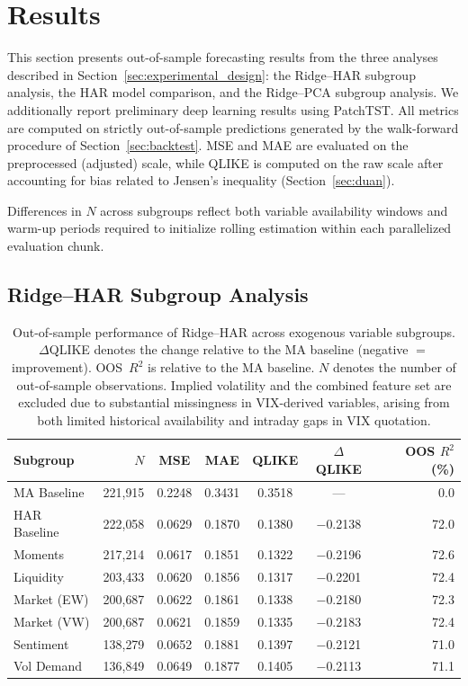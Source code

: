 \section{Results}
\label{sec:results}

This section presents out-of-sample forecasting results from the three analyses described in Section~\ref{sec:experimental_design}: the Ridge--HAR subgroup analysis, the HAR model comparison, and the Ridge--PCA subgroup analysis. We additionally report preliminary deep learning results using PatchTST. All metrics are computed on strictly out-of-sample predictions generated by the walk-forward procedure of Section~\ref{sec:backtest}. MSE and MAE are evaluated on the preprocessed (adjusted) scale, while QLIKE is computed on the raw scale after accounting for bias related to Jensen's inequality (Section~\ref{sec:duan}).

Differences in $N$ across subgroups reflect both variable availability 
windows and warm-up periods required to initialize rolling estimation 
within each parallelized evaluation chunk.

\subsection{Ridge--HAR Subgroup Analysis}
\label{sec:results_ridge_har}

\begin{table}[H]
\centering
\caption{Out-of-sample performance of Ridge--HAR across exogenous variable subgroups. $\Delta$QLIKE denotes the change relative to the MA baseline (negative $=$ improvement). OOS~$R^2$ is relative to the MA baseline. $N$ denotes the number of out-of-sample observations. Implied volatility and the combined feature set are excluded due to substantial missingness in VIX-derived variables, arising from both limited historical availability and intraday gaps in VIX quotation.}
\label{tab:ridge_har_subgroup}
\begin{tabular}{lrccccr}
\toprule
Subgroup & $N$ & MSE & MAE & QLIKE & $\Delta$QLIKE & OOS $R^2$ (\%) \\
\midrule
MA Baseline      & 221{,}915 & 0.2248 & 0.3431 & 0.3518 & ---       & 0.0 \\
HAR Baseline     & 222{,}058 & 0.0629 & 0.1870 & 0.1380 & $-$0.2138 & 72.0 \\
Moments          & 217{,}214 & 0.0617 & 0.1851 & 0.1322 & $-$0.2196 & 72.6 \\
Liquidity        & 203{,}433 & 0.0620 & 0.1856 & 0.1317 & $-$0.2201 & 72.4 \\
Market (EW)      & 200{,}687 & 0.0622 & 0.1861 & 0.1338 & $-$0.2180 & 72.3 \\
Market (VW)      & 200{,}687 & 0.0621 & 0.1859 & 0.1335 & $-$0.2183 & 72.4 \\
Sentiment        & 138{,}279 & 0.0652 & 0.1881 & 0.1397 & $-$0.2121 & 71.0 \\
Vol Demand       & 136{,}849 & 0.0649 & 0.1877 & 0.1405 & $-$0.2113 & 71.1 \\
\bottomrule
\end{tabular}
\end{table}


